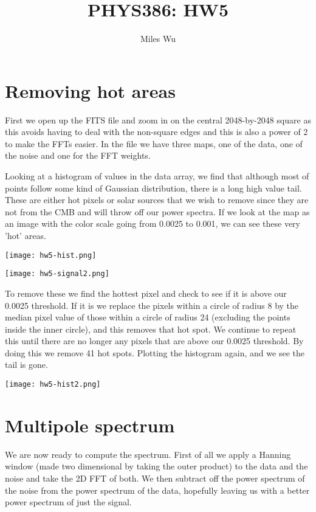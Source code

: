 \documentclass[12pt]{article}
\begin{document}
\title{PHYS386: HW5}
\author{Miles Wu}
\maketitle

\section{Removing hot areas}
First we open up the FITS file and zoom in on the central 2048-by-2048 square as this avoids having to deal with the non-square edges and this is also a power of 2 to make the FFTs easier.
In the file we have three maps, one of the data, one of the noise and one for the FFT weights.

Looking at a histogram of values in the data array, we find that although most of points follow some kind of Gaussian distribution, there is a long high value tail.
These are either hot pixels or solar sources that we wish to remove since they are not from the CMB and will throw off our power spectra.
If we look at the map as an image with the color scale going from 0.0025 to 0.001, we can see these very 'hot' areas.

\begin{center}
\texttt{[image: hw5-hist.png]}
\end{center}
\begin{center}
\texttt{[image: hw5-signal2.png]}
\end{center}

To remove these we find the hottest pixel and check to see if it is above our 0.0025 threshold.
If it is we replace the pixels within a circle of radius 8 by the median pixel value of those within a circle of radius 24 (excluding the points inside the inner circle), and this removes that hot spot.
We continue to repeat this until there are no longer any pixels that are above our 0.0025 threshold.
By doing this we remove 41 hot spots.
Plotting the histogram again, and we see the tail is gone.

\begin{center}
\texttt{[image: hw5-hist2.png]}
\end{center}

\section{Multipole spectrum}
We are now ready to compute the spectrum.
First of all we apply a Hanning window (made two dimensional by taking the outer product) to the data and the noise and take the 2D FFT of both.
We then subtract off the power spectrum of the noise from the power spectrum of the data, hopefully leaving us with a better power spectrum of just the signal.
\end{document}
